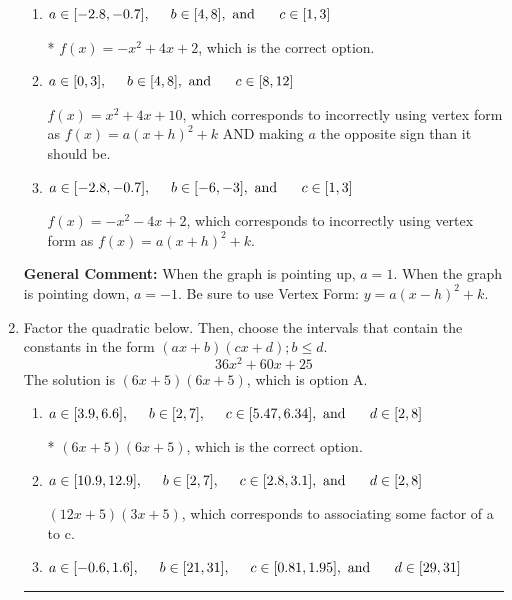 \documentclass{extbook}[14pt]
\newcommand{\litem}[1]{\item #1

\rule{\textwidth}{0.4pt}}
\begin{document}
\begin{enumerate}
{\begin{enumerate}[label=\Alph*.]
$f(x)=x^{2} -4 x + 10$, which corresponds to making $a$ the opposite sign than it should be.
\item \( a \in [-2.8, -0.7], \hspace*{5mm} b \in [4, 8], \text{ and } \hspace*{5mm} c \in [1, 3] \)

* $f(x)=-x^{2} +4 x + 2$, which is the correct option.
\item \( a \in [0, 3], \hspace*{5mm} b \in [4, 8], \text{ and } \hspace*{5mm} c \in [8, 12] \)

$f(x)=x^{2} +4 x + 10$, which corresponds to incorrectly using vertex form as $f(x) = a(x+h)^2+k$ AND making $a$ the opposite sign than it should be.
\item \( a \in [-2.8, -0.7], \hspace*{5mm} b \in [-6, -3], \text{ and } \hspace*{5mm} c \in [1, 3] \)

$f(x)=-x^{2} -4 x + 2$, which corresponds to incorrectly using vertex form as $f(x) = a(x+h)^2+k$.
\end{enumerate}

\textbf{General Comment:} When the graph is pointing up, $a=1$. When the graph is pointing down, $a=-1$. Be sure to use Vertex Form: $y = a(x-h)^2+k$.
}
\litem{
Factor the quadratic below. Then, choose the intervals that contain the constants in the form $(ax+b)(cx+d); b \leq d.$
\[ 36x^{2} +60 x + 25 \]The solution is \( (6x + 5)(6x + 5) \), which is option A.\begin{enumerate}[label=\Alph*.]
\item \( a \in [3.9, 6.6], \hspace*{5mm} b \in [2, 7], \hspace*{5mm} c \in [5.47, 6.34], \text{ and } \hspace*{5mm} d \in [2, 8] \)

* $(6x + 5)(6x + 5)$, which is the correct option.
\item \( a \in [10.9, 12.9], \hspace*{5mm} b \in [2, 7], \hspace*{5mm} c \in [2.8, 3.1], \text{ and } \hspace*{5mm} d \in [2, 8] \)

 $(12x + 5)(3x + 5)$, which corresponds to associating some factor of a to c.
\item \( a \in [-0.6, 1.6], \hspace*{5mm} b \in [21, 31], \hspace*{5mm} c \in [0.81, 1.95], \text{ and } \hspace*{5mm} d \in [29, 31] \)


\end{enumerate}}
\end{enumerate}
\end{document}
